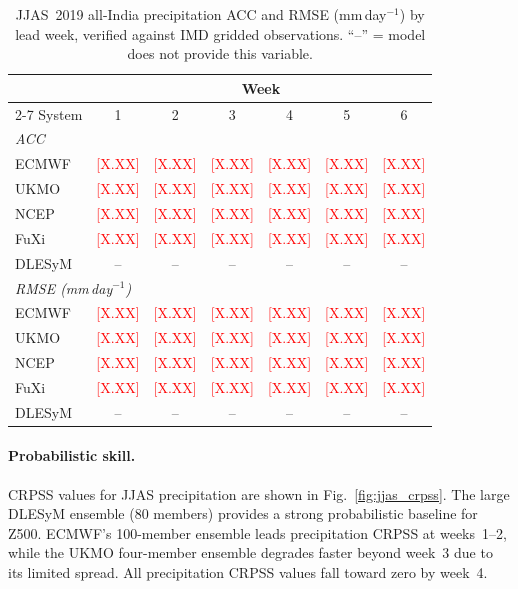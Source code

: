 \documentclass[11pt,a4paper]{article}
\newcommand{\phnum}{\textcolor{red}{[X.XX]}}
\begin{document}
\begin{table}[t]
  \caption{JJAS~2019 all-India precipitation ACC and RMSE (mm\,day$^{-1}$) by
  lead week, verified against IMD gridded observations. ``--'' = model does not
  provide this variable.}
  \label{tab:jjas_acc_tp}
  \centering
  \small
  \begin{tabular}{lcccccc}
    \toprule
    & \multicolumn{6}{c}{Week} \\
    \cmidrule(lr){2-7}
    System & 1 & 2 & 3 & 4 & 5 & 6 \\
    \midrule
    \multicolumn{7}{l}{\textit{ACC}} \\
    ECMWF   & \phnum & \phnum & \phnum & \phnum & \phnum & \phnum \\
    UKMO    & \phnum & \phnum & \phnum & \phnum & \phnum & \phnum \\
    NCEP    & \phnum & \phnum & \phnum & \phnum & \phnum & \phnum \\
    FuXi    & \phnum & \phnum & \phnum & \phnum & \phnum & \phnum \\
    DLESyM  & --     & --     & --     & --     & --     & -- \\
    \midrule
    \multicolumn{7}{l}{\textit{RMSE (mm\,day$^{-1}$)}} \\
    ECMWF   & \phnum & \phnum & \phnum & \phnum & \phnum & \phnum \\
    UKMO    & \phnum & \phnum & \phnum & \phnum & \phnum & \phnum \\
    NCEP    & \phnum & \phnum & \phnum & \phnum & \phnum & \phnum \\
    FuXi    & \phnum & \phnum & \phnum & \phnum & \phnum & \phnum \\
    DLESyM  & --     & --     & --     & --     & --     & -- \\
    \bottomrule
  \end{tabular}
\end{table}

\paragraph{Probabilistic skill.}
CRPSS values for JJAS precipitation are shown in Fig.~\ref{fig:jjas_crpss}.
The large DLESyM ensemble (80 members) provides a strong probabilistic baseline
for Z500. ECMWF's 100-member ensemble leads precipitation CRPSS at weeks~1--2,
while the UKMO four-member ensemble degrades faster beyond week~3 due to its
limited spread. All precipitation CRPSS values fall toward zero by week~4.
\end{document}

